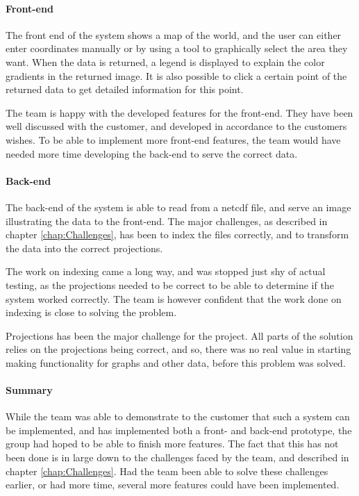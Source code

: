 \documentclass[11pt,a4paper,titlepage,oneside]{report}
\begin{document}
\paragraph{Front-end}
The front end of the system shows a map of the world, and the user can either enter coordinates manually or by using a tool to graphically select the area they want. When the data is returned, a legend is displayed to explain the color gradients in the returned image. It is also possible to click a certain point of the returned data to get detailed information for this point.

The team is happy with the developed features for the \gls{front-end}. They have been well discussed with the customer, and developed in accordance to the customers wishes. To be able to implement more \gls{front-end} features, the team would have needed more time developing the \gls{back-end} to serve the correct data. 

\paragraph{Back-end}
The \gls{back-end} of the system is able to read from a \gls{netcdf} file, and serve an image illustrating the data to the \gls{front-end}. The major challenges, as described in chapter \ref{chap:Challenges}, has been to index the files correctly, and to transform the data into the correct projections. 

The work on indexing came a long way, and was stopped just shy of actual testing, as the projections needed to be correct to be able to determine if the system worked correctly. The team is however confident that the work done on indexing is close to solving the problem.

Projections has been the major challenge for the project. All parts of the solution relies on the projections being correct, and so, there was no real value in starting making functionality for graphs and other data, before this problem was solved. 

\paragraph{Summary} While the team was able to demonstrate to the customer that such a system can be implemented, and has implemented both a front- and back-end \gls{prototype}, the group had hoped to be able to finish more features. The fact that this has not been done is in large down to the challenges faced by the team, and described in chapter \ref{chap:Challenges}. Had the team been able to solve these challenges earlier, or had more time, several more features could have been implemented.
\end{document}

